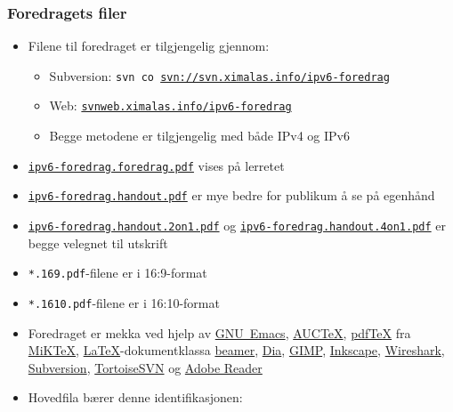 \begin{frame}[allowframebreaks]
  \frametitle{Foredragets filer}
  \begin{itemize}
  \item Filene til foredraget er tilgjengelig gjennom:
    \begin{itemize}
    \item Subversion: \texttt{svn co
        \url{svn://svn.ximalas.info/ipv6-foredrag}}
    \item Web:
      \href{http://svnweb.ximalas.info/ipv6-foredrag/}{\texttt{svnweb.ximalas.info/ipv6-foredrag}}
    \item Begge metodene er tilgjengelig med både IPv4 og \alert{IPv6}
    \end{itemize}
  \item
    \href{http://svnweb.ximalas.info/ipv6-foredrag/trunk/ipv6-foredrag.foredrag.pdf?view=co}{\texttt{ipv6-foredrag.foredrag.pdf}}
    vises på lerretet
  \item
    \href{http://svnweb.ximalas.info/ipv6-foredrag/trunk/ipv6-foredrag.handout.pdf?view=co}{\texttt{ipv6-foredrag.handout.pdf}}
    er mye bedre for publikum å se på egenhånd
  \item
    \href{http://svnweb.ximalas.info/ipv6-foredrag/trunk/ipv6-foredrag.handout.2on1.pdf?view=co}{\texttt{ipv6-foredrag.handout.2on1.pdf}}
    og
    \href{http://svnweb.ximalas.info/ipv6-foredrag/trunk/ipv6-foredrag.handout.4on1.pdf?view=co}{\texttt{ipv6-foredrag.handout.4on1.pdf}}
    er begge velegnet til utskrift
  \item \texttt{*.169.pdf}-filene er i 16:9-format
  \item \texttt{*.1610.pdf}-filene er i 16:10-format
  \framebreak
  \item Foredraget er mekka ved hjelp av
    \href{http://www.gnu.org/software/emacs/}{GNU~Emacs},
    \href{http://www.gnu.org/software/auctex/}{AUC\TeX},
    \href{http://www.tug.org/applications/pdftex/}{pdf\TeX} fra
    \href{http://miktex.org/}{MiK\TeX},
    \href{http://www.latex-project.org/}{\LaTeX}-dokumentklassa
    \href{https://bitbucket.org/rivanvx/beamer/wiki/Home}{beamer},
    \href{https://wiki.gnome.org/Apps/Dia/}{Dia},
    \href{http://www.gimp.org/}{GIMP},
    \href{http://www.inkscape.org/en/}{Inkscape},
    \href{http://www.wireshark.org/}{Wireshark},
    \href{http://subversion.apache.org/}{Subversion},
    \href{http://tortoisesvn.net/}{TortoiseSVN} og
    \href{http://get.adobe.com/no/reader/}{Adobe Reader}
  \item Hovedfila bærer denne identifikasjonen:\\

\end{itemize}
\end{frame}
